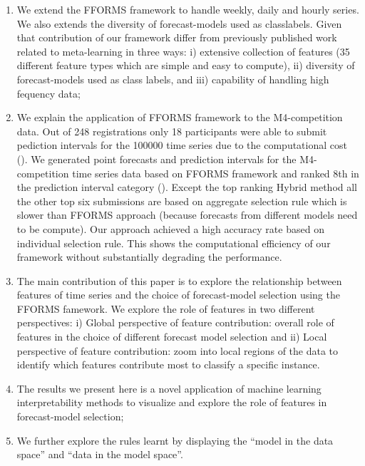 \documentclass[11pt,a4paper,]{article}
\providecommand{\tightlist}{%
  \setlength{\itemsep}{0pt}\setlength{\parskip}{0pt}}
\begin{document}
\begin{enumerate}
\def\labelenumi{\arabic{enumi}.}
\tightlist
\item
  We extend the FFORMS framework to handle weekly, daily and hourly
  series. We also extends the diversity of forecast-models used as
  classlabels. Given that contribution of our framework differ from
  previously published work related to meta-learning in three ways: i)
  extensive collection of features (35 different feature types which are
  simple and easy to compute), ii) diversity of forecast-models used as
  class labels, and iii) capability of handling high fequency data;
\item
  We explain the application of FFORMS framework to the M4-competition
  data. Out of 248 registrations only 18 participants were able to
  submit pediction intervals for the 100000 time series due to the
  computational cost (\textcite{Makridakis2018dx}). We generated point
  forecasts and prediction intervals for the M4-competition time series
  data based on FFORMS framework and ranked 8th in the prediction
  interval category (\textcite{Makridakis2018dx}). Except the top
  ranking Hybrid method all the other top six submissions are based on
  aggregate selection rule which is slower than FFORMS approach (because
  forecasts from different models need to be compute). Our approach
  achieved a high accuracy rate based on individual selection rule. This
  shows the computational efficiency of our framework without
  substantially degrading the performance.
\item
  The main contribution of this paper is to explore the relationship
  between features of time series and the choice of forecast-model
  selection using the FFORMS famework. We explore the role of features
  in two different perspectives: i) Global perspective of feature
  contribution: overall role of features in the choice of different
  forecast model selection and ii) Local perspective of feature
  contribution: zoom into local regions of the data to identify which
  features contribute most to classify a specific instance.
\item
  The results we present here is a novel application of machine learning
  interpretability methods to visualize and explore the role of features
  in forecast-model selection;
\item
  We further explore the rules learnt by displaying the ``model in the
  data space'' and ``data in the model space''.
\end{enumerate}
\end{document}
